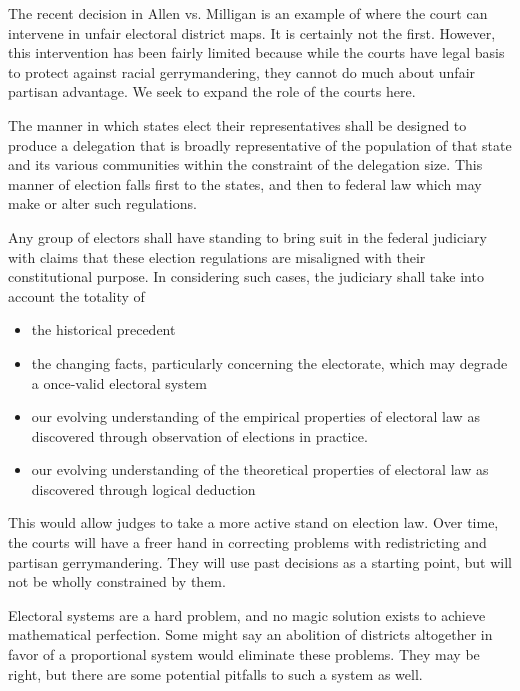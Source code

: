 \documentclass{article}
\begin{document}
The recent decision in Allen vs. Milligan\cite{Allen_Milligan} is an example of where the court can intervene in unfair electoral district maps. It is certainly not the first. However, this intervention has been fairly limited\cite{Brewer} because while the courts have legal basis to protect against racial gerrymandering, they cannot do much about unfair partisan advantage. We seek to expand the role of the courts here.

\begin{quoting}
The manner in which states elect their representatives shall be designed to produce a delegation that is broadly representative of the population of that state and its various communities within the constraint of the delegation size. This manner of election falls first to the states, and then to federal law which may make or alter such regulations.

Any group of electors shall have standing to bring suit in the federal judiciary with claims that these election regulations are misaligned with their constitutional purpose. In considering such cases, the judiciary shall take into account the totality of
\begin{itemize}
\item the historical precedent
\item the changing facts, particularly concerning the electorate, which may degrade a once-valid electoral system
\item our evolving understanding of the empirical properties of electoral law as discovered through observation of elections in practice.
\item our evolving understanding of the theoretical properties of electoral law as discovered through logical deduction
\end{itemize}
\end{quoting}

This would allow judges to take a more active stand on election law. Over time, the courts will have a freer hand in correcting problems with redistricting and partisan gerrymandering. They will use past decisions as a starting point, but will not be wholly constrained by them.

Electoral systems are a hard problem, and no magic solution exists to achieve mathematical perfection. Some might say an abolition of districts altogether in favor of a proportional system would eliminate these problems. They may be right, but there are some potential pitfalls to such a system as well.
\end{document}

